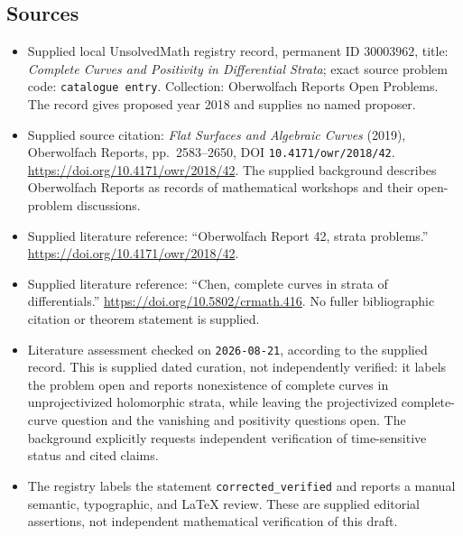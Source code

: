 \documentclass[11pt]{article}
\begin{document}
\subsection{Sources}
\begin{itemize}
\item Supplied local UnsolvedMath registry record, permanent ID \(30003962\), title: \emph{Complete Curves and Positivity in Differential Strata}; exact source problem code: \texttt{catalogue entry}. Collection: Oberwolfach Reports Open Problems. The record gives proposed year 2018 and supplies no named proposer.
\item Supplied source citation: \emph{Flat Surfaces and Algebraic Curves} (2019), Oberwolfach Reports, pp.\ 2583--2650, DOI \texttt{10.4171/owr/2018/42}. \url{https://doi.org/10.4171/owr/2018/42}. The supplied background describes Oberwolfach Reports as records of mathematical workshops and their open-problem discussions.
\item Supplied literature reference: ``Oberwolfach Report 42, strata problems.'' \url{https://doi.org/10.4171/owr/2018/42}.
\item Supplied literature reference: ``Chen, complete curves in strata of differentials.'' \url{https://doi.org/10.5802/crmath.416}. No fuller bibliographic citation or theorem statement is supplied.
\item Literature assessment checked on \texttt{2026-08-21}, according to the supplied record. This is supplied dated curation, not independently verified: it labels the problem open and reports nonexistence of complete curves in unprojectivized holomorphic strata, while leaving the projectivized complete-curve question and the vanishing and positivity questions open. The background explicitly requests independent verification of time-sensitive status and cited claims.
\item The registry labels the statement \texttt{corrected\_verified} and reports a manual semantic, typographic, and LaTeX review. These are supplied editorial assertions, not independent mathematical verification of this draft.
\end{itemize}
\end{document}
